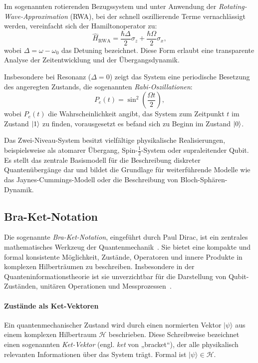 Im sogenannten rotierenden Bezugssystem und unter Anwendung der \emph{Rotating-Wave-Approximation} (RWA), bei der schnell oszillierende Terme vernachlässigt werden, vereinfacht sich der Hamiltonoperator zu:
\begin{equation}
\hat{H}_{\text{RWA}} = \frac{\hbar \Delta}{2} \sigma_z + \frac{\hbar \Omega}{2} \sigma_x,
\end{equation}
wobei $\Delta = \omega - \omega_0$ das Detuning bezeichnet. Diese Form erlaubt eine transparente Analyse der Zeitentwicklung und der Übergangsdynamik.

Insbesondere bei Resonanz ($\Delta = 0$) zeigt das System eine periodische Besetzung des angeregten Zustands, die sogenannten \textit{Rabi-Oszillationen}:
\begin{equation}
P_e(t) = \sin^2\left(\frac{\Omega t}{2}\right),
\end{equation}
wobei $P_e(t)$ die Wahrscheinlichkeit angibt, das System zum Zeitpunkt $t$ im Zustand $\ket{1}$ zu finden, vorausgesetzt es befand sich zu Beginn im Zustand $\ket{0}$.

Das Zwei-Niveau-System besitzt vielfältige physikalische Realisierungen, beispielsweise als atomarer Übergang, Spin-$\frac{1}{2}$-System oder supraleitender Qubit. Es stellt das zentrale Basismodell für die Beschreibung diskreter Quantenübergänge dar und bildet die Grundlage für weiterführende Modelle wie das Jaynes-Cummings-Modell oder die Beschreibung von Bloch-Sphären-Dynamik.


\subsection{Bra-Ket-Notation}
\label{sec:braket}

Die sogenannte \textit{Bra-Ket-Notation}, eingeführt durch Paul Dirac, ist ein zentrales mathematisches Werkzeug der Quantenmechanik~\cite{dirac1958principles}. Sie bietet eine kompakte und formal konsistente Möglichkeit, Zustände, Operatoren und innere Produkte in komplexen Hilberträumen zu beschreiben. Insbesondere in der Quanteninformationstheorie ist sie unverzichtbar für die Darstellung von Qubit-Zuständen, unitären Operationen und Messprozessen~\cite{nielsen2002quantum}.

\vspace{0.5em}
\paragraph{Zustände als Ket-Vektoren}
Ein quantenmechanischer Zustand wird durch einen normierten Vektor $|\psi\rangle$ aus einem komplexen Hilbertraum $\mathcal{H}$ beschrieben. Diese Schreibweise bezeichnet einen sogenannten \emph{Ket-Vektor} (engl. \textit{ket} von „bracket“), der alle physikalisch relevanten Informationen über das System trägt. Formal ist $|\psi\rangle \in \mathcal{H}$.


